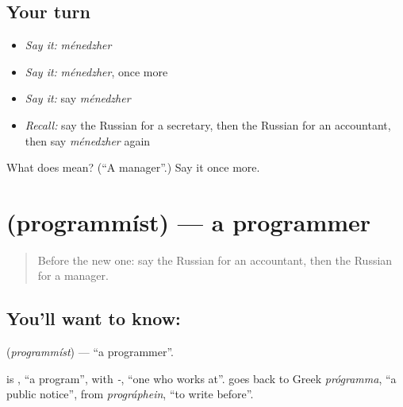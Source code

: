 \subsection*{Your turn}
\begin{itemize}
\raggedright
  \item \emph{Say it:} \emph{ménedzher}
  \item \emph{Say it:} \emph{ménedzher}, once more
  \item \emph{Say it:} say \emph{ménedzher}
  \item \emph{Recall:} say the Russian for a secretary, then the Russian for an accountant, then say \emph{ménedzher} again
\end{itemize}

\begin{tcolorbox}[breakable,colback=teal!4,colframe=teal!35!black,title={Before you move on}]
What does  mean? (\textquotedblleft{}A manager\textquotedblright{}.) Say it once more.
\end{tcolorbox}
\section[\texorpdfstring{\ru{программист} (programmíst)}{программист (programmíst)}]{ (programmíst) — a programmer}

\label{lesson:RU-C229-programmist}



\begin{quote}
Before the new one: say the Russian for an accountant, then the Russian for a manager.
\end{quote}

\subsection*{You'll want to know: }
\textbf{} (\emph{programmíst}) — \textquotedblleft{}a programmer\textquotedblright{}.

\begin{cousinweb}
\textbf{} is \emph{}, \textquotedblleft{}a program\textquotedblright{}, with \emph{-}, \textquotedblleft{}one who works at\textquotedblright{}. \emph{} goes back to Greek \emph{prógramma}, \textquotedblleft{}a public notice\textquotedblright{}, from \emph{prográphein}, \textquotedblleft{}to write before\textquotedblright{}.
\end{cousinweb}

